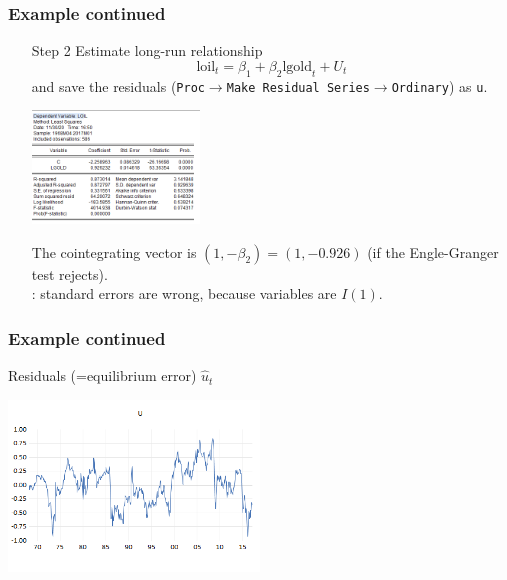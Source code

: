 \begin{frame}\frametitle{Example continued}
\begin{itemize}
\item[Step 2] Estimate long-run relationship
\[
\textrm{loil}_t = \beta_1+\beta_2\textrm{lgold}_t+U_t
\]
and save the residuals (\texttt{Proc}$\rightarrow$\texttt{Make Residual Series}$\rightarrow$\texttt{Ordinary}) as \texttt{u}.
\begin{center}
\includegraphics[width=0.35\textwidth]{longrun}
\end{center}
The cointegrating vector is $(1, -\beta_2) = (1, -0.926)$ (if the Engle-Granger test rejects). \\
: standard errors are wrong, because variables are $I(1)$.
\end{itemize}
\end{frame}
\begin{frame}\frametitle{Example continued}
\begin{block}{Residuals (=equilibrium error) $\hat{u}_t$}
\begin{center}
\includegraphics[width=0.5\textwidth]{residuals.png}
\end{center}
\end{block}
\end{frame}

